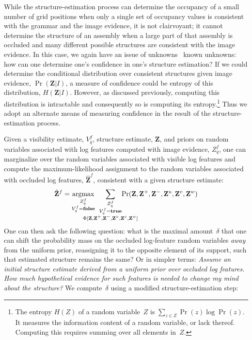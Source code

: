 While the structure-estimation process can determine the occupancy of a small
number of grid positions when only a single set of occupancy values is
consistent with the grammar and the image evidence, it is not clairvoyant; it
cannot determine the structure of an assembly when a large part of that
assembly is occluded and many different possible structures are consistent with
the image evidence.
%
In this case, we again have an issue of unknowns \vs\ known unknowns: how can
one determine one's confidence in one's structure estimation?
%
If we could determine the conditional distribution over consistent structures
given image evidence, $\Pr(\mathbf{Z}|I)$, a measure of confidence could be
entropy of this distribution, $H(\mathbf{Z}|I)$.
%
However, as discussed previously, computing this distribution is intractable
and consequently so is computing its entropy.\footnote{The entropy $H(Z)$ of a
  random variable~$Z$ is $\sum_{z\in Z}\Pr(z)\log\Pr(z)$.
  It measures the information content of a random variable, or lack thereof.
  Computing this requires summing over all elements in~$Z$.}
%
Thus we adopt an alternate means of measuring confidence in the result of the
structure-estimation process.

Given a visibility estimate, $V^f_q$, structure estimate, $\mathbf{Z}$, and
priors on random variables associated with log features computed with
image evidence, $Z^f_q$, one can marginalize over the random variables
associated with visible log features and compute the maximum-likelihood
assignment to the random variables associated with occluded log features,
$\hat{\mathbf{Z}}^f$, consistent with a given structure estimate:
%
\vspace*{0.5ex}
\begin{equation*}
  \hat{\mathbf{Z}}^f=
  \argmax_{\substack{Z^f_q\\V^f_q=\false}}\hspace{-4.5ex}
  \sum_{\substack{Z^f_q\\V^f_q=\true\\
      \Phi[\mathbf{Z},\mathbf{Z}^{+},\mathbf{Z}^{-},\mathbf{Z}^u,\mathbf{Z}^v,\mathbf{Z}^w]}}\hspace{-6ex}
  \Pr(\mathbf{Z},\mathbf{Z}^{+},\mathbf{Z}^{-},\mathbf{Z}^u,\mathbf{Z}^v,\mathbf{Z}^w)
\end{equation*}
\vspace*{0.5ex}
%
One can then ask the following question: what is the maximal amount~$\delta$
that one can shift the probability mass on the occluded log-feature random
variables \emph{away} from the uniform prior, reassigning it to the opposite
element of its support, such that estimated structure remains the same?
%
Or in simpler terms: \emph{Assume an initial structure estimate derived from a
  uniform prior over occluded log features.
  How much hypothetical evidence for such features is needed to change my mind
  about the structure?}
%
We compute~$\delta$ using a modified structure-estimation step:

